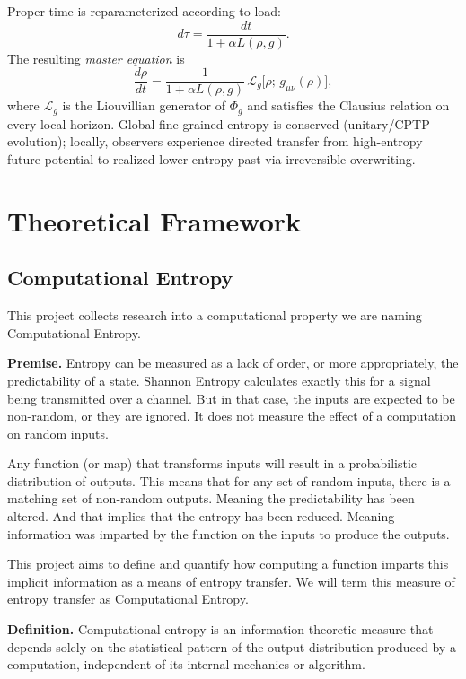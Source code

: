 \documentclass[reprint,amsmath,amssymb,aps,prd,preprintnumbers,superscriptaddress,longbibliography,10pt]{revtex4-2}
\begin{document}
Proper time is reparameterized according to load:
\[
d\tau = \frac{dt}{1 + \alpha L(\rho,g)}.
\]
The resulting \emph{master equation} is
\[
\frac{d\rho}{dt} = \frac{1}{1 + \alpha L(\rho,g)} \,\mathcal{L}_g\bigl[\rho;\, g_{\mu\nu}(\rho)\bigr],
\]
where \(\mathcal{L}_g\) is the Liouvillian generator of \(\Phi_g\) and satisfies the Clausius relation on every local horizon. Global fine-grained entropy is conserved (unitary/CPTP evolution); locally, observers experience directed transfer from high-entropy future potential to realized lower-entropy past via irreversible overwriting.

\section{Theoretical Framework}

\subsection{Computational Entropy}

This project collects research into a computational property we are naming Computational Entropy.

\textbf{Premise.} Entropy can be measured as a lack of order, or more appropriately, the predictability of a state. Shannon Entropy calculates exactly this for a signal being transmitted over a channel. But in that case, the inputs are expected to be non-random, or they are ignored. It does not measure the effect of a computation on random inputs.

Any function (or map) that transforms inputs will result in a probabilistic distribution of outputs. This means that for any set of random inputs, there is a matching set of non-random outputs. Meaning the predictability has been altered. And that implies that the entropy has been reduced. Meaning information was imparted by the function on the inputs to produce the outputs.

This project aims to define and quantify how computing a function imparts this implicit information as a means of entropy transfer. We will term this measure of entropy transfer as Computational Entropy.

\textbf{Definition.} Computational entropy is an information-theoretic measure that depends solely on the statistical pattern of the output distribution produced by a computation, independent of its internal mechanics or algorithm.
\end{document}
